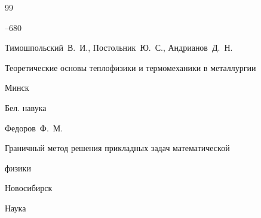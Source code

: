 \begin{thebibliography}{99}


--680


















\by Тимошпольский~В.~И., Постольник~Ю.~С., Андрианов~Д.~Н.

\book Теоретические основы теплофизики и термомеханики в металлургии

\publaddr Минск

\publ Бел. навука










\by Федоров~Ф.~М.

\book Граничный метод решения прикладных задач математической

физики

\publaddr Новосибирск

\publ Наука







\end{thebibliography}
